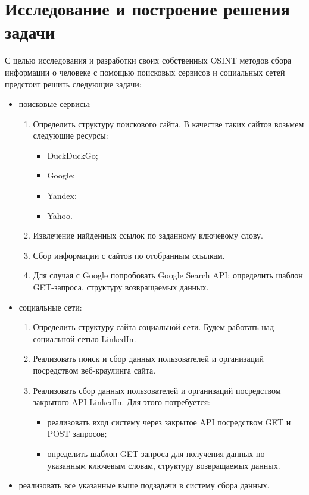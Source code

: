 \section{Исследование и построение решения задачи}
\label{sec:Chapter3} 
С целью исследования и разработки своих собственных OSINT методов сбора информации о человеке с помощью поисковых сервисов и 
социальных сетей предстоит решить следующие задачи:
\begin{itemize}
    \item поисковые сервисы:
    \begin{enumerate}
        \item Определить структуру поискового сайта. В качестве таких сайтов возьмем следующие ресурсы:
        \begin{itemize}
            \item DuckDuckGo;
            \item Google;
            \item Yandex;
            \item Yahoo.
        \end{itemize}
        \item Извлечение найденных ссылок по заданному ключевому слову.
        \item Сбор информации с сайтов по отобранным ссылкам.
        \item Для случая с Google попробовать Google Search API: определить шаблон GET-запроса, структуру возвращаемых данных.
    \end{enumerate}
    \item социальные сети:
    \begin{enumerate}
        \item Определить структуру сайта социальной сети. Будем работать над социальной сетью LinkedIn.
        \item Реализовать поиск и сбор данных пользователей и организаций посредством веб-краулинга сайта.
        \item Реализовать сбор данных пользователей и организаций посредством закрытого API LinkedIn. Для этого потребуется:
        \begin{itemize}
            \item реализовать вход систему через закрытое API посредством GET и POST запросов;
            \item определить шаблон GET-запроса для получения данных по указанным ключевым словам, структуру возвращаемых данных.
        \end{itemize}
    \end{enumerate}
    \item реализовать все указанные выше подзадачи в систему сбора данных. 
\end{itemize}

